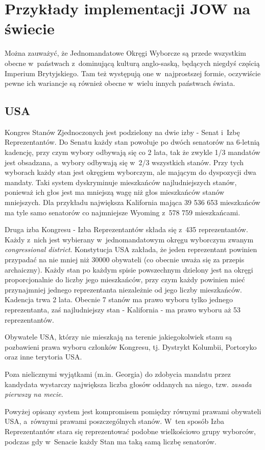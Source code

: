 \section{Przykłady implementacji JOW na świecie}
Można zauważyć, że Jednomandatowe Okręgi Wyborcze są przede wszystkim obecne w~państwach z~dominującą kulturą anglo-saską, będących niegdyś częścią Imperium Brytyjskiego. Tam też występują one w~najprostszej formie, oczywiście pewne ich wariancje są również obecne w~wielu innych państwach świata.
\subsection{USA}
Kongres Stanów Zjednoczonych jest podzielony na dwie izby  - Senat i~Izbę Reprezentantów. Do Senatu każdy stan powołuje po dwóch senatorów na 6-letnią kadencję, przy czym wybory odbywają się co 2 lata, tak że zwykle 1/3 mandatów jest obsadzana, a~wybory odbywają się w~2/3 wszystkich stanów. Przy tych wyborach każdy stan jest okręgiem wyborczym, ale mającym do dyspozycji dwa mandaty. Taki system dyskryminuje mieszkańców najludniejszych stanów, ponieważ ich głos jest ma mniejszą wagę niż głos mieszkańców stanów mniejszych. Dla przykładu największa Kalifornia mająca 39 536 653 mieszkańców ma tyle samo senatorów co najmniejsze Wyoming z~578 759 mieszkańcami.

Druga izba Kongresu - Izba Reprezentantów składa się z~435 reprezentantów. Każdy z~nich jest wybierany w~jednomandatowym okręgu wyborczym zwanym \textit{congressional district}. Konstytucja USA zakłada, że jeden reprezentant powinien przypadać na nie mniej niż 30000 obywateli (co obecnie uważa się za przepis archaiczny). Każdy stan po każdym spisie powszechnym dzielony jest na okręgi proporcjonalnie do liczby jego mieszkańców, przy czym każdy powinien mieć przynajmniej jednego reprezentanta niezależnie od jego liczby mieszkańców. Kadencja trwa 2 lata. Obecnie 7 stanów ma prawo wyboru tylko jednego reprezentanta, zaś najludniejszy stan - Kalifornia - ma prawo wyboru aż 53 reprezentantów. 

Obywatele USA, którzy nie mieszkają na terenie jakiegokolwiek stanu są pozbawieni prawa wyboru członków Kongresu, tj. Dystrykt Kolumbii, Portoryko oraz inne terytoria USA. 

Poza nielicznymi wyjątkami (m.in. Georgia) do zdobycia mandatu przez kandydata wystarczy największa liczba głosów oddanych na niego, tzw. \textit{zasada pierwszy na mecie}.

Powyżej opisany system jest kompromisem pomiędzy równymi prawami obywateli USA, a~równymi prawami poszczególnych stanów. W~ten sposób Izba Reprezentantów stara się reprezentować podobne wielkościowo grupy wyborców, podczas gdy w~Senacie każdy Stan ma taką samą liczbę senatorów.

